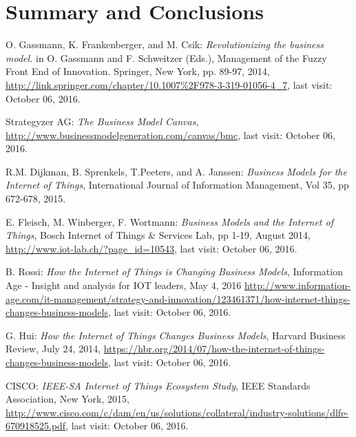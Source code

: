 \section{Summary and Conclusions}

	 \begin{thebibliography}{99}
 		  O. Gassmann, K. Frankenberger, and M. Csik: \emph{Revolutionizing the business model.} in O. Gassmann and F. Schweitzer (Eds.), Management of the Fuzzy Front End of Innovation. Springer, New York, pp. 89-97, 2014, \url{http://link.springer.com/chapter/10.1007%2F978-3-319-01056-4_7}, last visit: October 06, 2016.

 		  Strategyzer AG: \emph{The Business Model Canvas}, \url{http://www.businessmodelgeneration.com/canvas/bmc}, last visit: October 06, 2016.

 		  R.M. Dijkman, B. Sprenkels, T.Peeters, and A. Janssen: \emph{Business Models for the Internet of Things}, International Journal of Information Management, Vol 35, pp 672-678, 2015.

 		  E. Fleisch, M. Winberger, F. Wortmann: \emph{Business Models and the Internet of Things}, Bosch Internet of Things \& Services Lab, pp 1-19, August 2014, \url{http://www.iot-lab.ch/?page_id=10543}, last visit: October 06, 2016.

 		  B. Rossi: \emph{How the Internet of Things is Changing Business Models}, Information Age - Insight and analysis for IOT leaders, May 4, 2016 \url{http://www.information-age.com/it-management/strategy-and-innovation/123461371/how-internet-things-changes-business-models}, last visit: October 06, 2016.

 		  G. Hui: \emph{How the Internet of Things Changes Business Models}, Harvard Business Review, July 24, 2014, \url{https://hbr.org/2014/07/how-the-internet-of-things-changes-business-models}, last visit: October 06, 2016.

 		  CISCO: \emph{IEEE-SA Internet of Things Ecosystem Study}, IEEE Standards Association, New York, 2015, \url{http://www.cisco.com/c/dam/en/us/solutions/collateral/industry-solutions/dlfe-670918525.pdf}, last visit: October 06, 2016.


\end{thebibliography}
